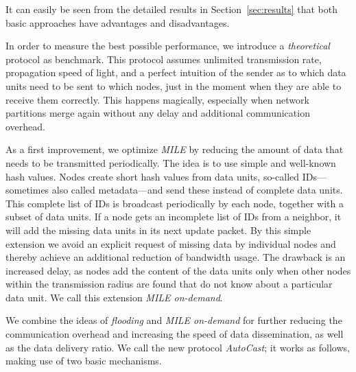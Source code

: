 \documentclass{acmrip}
\newcommand{\secref}[1]{Section~\ref{sec:#1}}
\begin{document}
It can easily be seen from the detailed results in
\secref{results} that both basic approaches have advantages and
disadvantages.

In order to measure the best possible performance, we introduce a
\textit{theoretical} protocol as benchmark. This protocol assumes
unlimited transmission rate, propagation speed of light, and a
perfect intuition of the sender as to which data units need to be
sent to which nodes, just in the moment when they are able to
receive them correctly. This happens magically, especially when
network partitions merge again without any delay and additional
communication overhead.

As a first improvement, we optimize \textit{MILE} by reducing the
amount of data that needs to be transmitted periodically. The idea
is to use simple and well-known hash values. Nodes create short hash
values from data units, so-called IDs---sometimes also called
metadata---and send these instead of complete data units. This
complete list of IDs is broadcast periodically by each node,
 together with a subset of data units.
If a node gets an incomplete list of IDs from a neighbor, it will
add the missing data units in its next update packet. By this simple
extension we avoid an explicit request of missing data by individual
nodes and thereby achieve an additional reduction of bandwidth
usage. The drawback is an increased delay, as nodes add the content
of the data units only when other nodes within the transmission
radius are found that do not know about a particular data unit. We
call this extension \textit{MILE on-demand}.

We combine the ideas of \textit{flooding} and \textit{MILE
on-demand} for further reducing the communication overhead and
increasing the speed of data dissemination, as well as the data
delivery ratio. We call the new protocol \textit{AutoCast}; it works
as follows, making use of two basic mechanisms.
\end{document}
